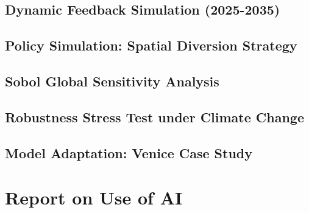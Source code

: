 \documentclass{mcmthesis}
\begin{document}
\begin{appendices}
\subsection{Dynamic Feedback Simulation (2025-2035)}


\subsection{Policy Simulation: Spatial Diversion Strategy}


\subsection{Sobol Global Sensitivity Analysis}


\subsection{Robustness Stress Test under Climate Change}


\subsection{Model Adaptation: Venice Case Study}

\end{appendices}
\newpage
\section*{Report on Use of AI}
\end{document}
